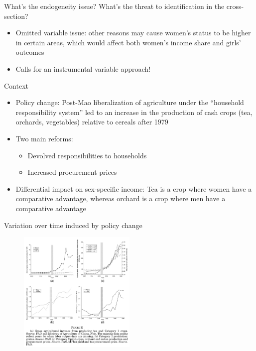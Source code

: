 \documentclass[11pt,notes=hide,aspectratio=169,mathserif]{beamer}
\begin{document}
\begin{frame}{What's the endogeneity issue?}
What's the threat to identification in the cross-section?
\begin{itemize}
\pause \item Omitted variable issue: other reasons may cause women's status to be higher in certain areas, which would affect both women's income share and girls' outcomes
\item Calls for an instrumental variable approach!
\end{itemize}
\end{frame}

\begin{frame}{Context}
\begin{itemize}
\item Policy change: Post-Mao liberalization of agriculture under the “household responsibility system” led to an increase in the production of cash crops (tea, orchards, vegetables) relative to cereals after 1979
\item Two main reforms:
\begin{itemize}
    \item Devolved responsibilities to households
    \item Increased procurement prices
\end{itemize}
\item Differential impact on sex-specific income: Tea is a crop where women have a comparative advantage, whereas orchard is a crop where men have a comparative advantage
\end{itemize}
\end{frame}

\begin{frame}{Variation over time induced by policy change}
\begin{figure}
\centering
\includegraphics[width=0.5\textwidth]{inputs/fig2.png}
\end{figure}
\end{frame}
\end{document}
